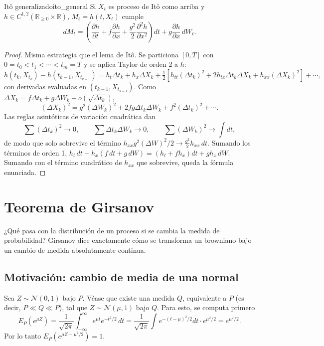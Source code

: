 \documentclass[11pt, a4paper]{article}
\begin{document}
\begin{teorema}{Itô generalizado}{ito_general}
Si $X_t$ es proceso de Itô como arriba y $h \in C^{1,2}(\mathbb{R}_{\ge 0} \times \mathbb{R})$,
$M_t = h(t, X_t)$ cumple
$$ dM_t = \left(\frac{\partial h}{\partial t} + f \frac{\partial h}{\partial x} + \frac{g^2}{2}
\frac{\partial^2 h}{\partial x^2}\right) dt + g \frac{\partial h}{\partial x} \, dW_t. $$
\end{teorema}

\begin{proof}
Misma estrategia que el lema de Itô. Se particiona $[0, T]$ con $0 = t_0 < t_1 < \cdots < t_m =
T$ y se aplica Taylor de orden 2 a $h$:
$$ h(t_k, X_{t_k}) - h(t_{k-1}, X_{t_{k-1}}) = h_t \Delta t_k + h_x \Delta X_k + \tfrac{1}{2}
[h_{tt} (\Delta t_k)^2 + 2 h_{tx} \Delta t_k \Delta X_k + h_{xx} (\Delta X_k)^2] + \cdots, $$
con derivadas evaluadas en $(t_{k-1}, X_{t_{k-1}})$. Como $\Delta X_k = f \Delta t_k + g \Delta W_k
+ o(\sqrt{\Delta t_k})$,
$$ (\Delta X_k)^2 = g^2 (\Delta W_k)^2 + 2 f g \Delta t_k \Delta W_k + f^2 (\Delta t_k)^2 +
\cdots. $$
Las reglas asintóticas de variación cuadrática dan
$$ \sum (\Delta t_k)^2 \to 0, \qquad \sum \Delta t_k \Delta W_k \to 0, \qquad \sum (\Delta W_k)^2
\to \int dt, $$
de modo que solo sobrevive el término $h_{xx} g^2 (\Delta W)^2 / 2 \to \tfrac{g^2}{2} h_{xx} \, dt$.
Sumando los términos de orden 1, $h_t \, dt + h_x (f \, dt + g \, dW) = (h_t + f h_x) dt + g h_x
\, dW$. Sumando con el término cuadrático de $h_{xx}$ que sobrevive, queda la fórmula
enunciada.
\end{proof}

\newpage

\section{Teorema de Girsanov}

¿Qué pasa con la distribución de un proceso si se cambia la medida de probabilidad?
Girsanov dice exactamente cómo se transforma un browniano bajo un cambio de medida
absolutamente continua.

\subsection{Motivación: cambio de media de una normal}

Sea $Z \sim \mathcal{N}(0, 1)$ bajo $P$. Véase que existe una medida $Q$, equivalente a $P$ (es
decir, $P \ll Q \ll P$), tal que $Z \sim \mathcal{N}(\mu, 1)$ bajo $Q$. Para esto, se computa
primero
$$ E_P(e^{\mu Z}) = \frac{1}{\sqrt{2\pi}} \int_{-\infty}^\infty e^{\mu t} e^{-t^2/2} \, dt =
\frac{1}{\sqrt{2\pi}} \int e^{-(t-\mu)^2/2} dt \cdot e^{\mu^2/2} = e^{\mu^2/2}. $$
Por lo tanto $E_P(e^{\mu Z - \mu^2/2}) = 1$.
\end{document}

